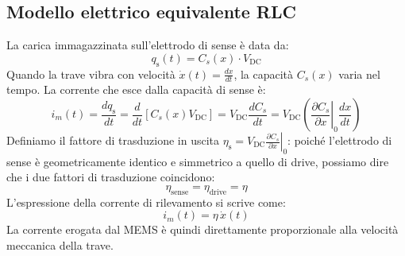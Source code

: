 \documentclass[11pt,a4paper]{article}
\begin{document}
\newpage

\subsection{Modello elettrico equivalente RLC}
\label{sec:modello_rlc}

La carica immagazzinata sull'elettrodo di sense è data da:
\begin{equation}
    q_{\text{s}}(t) = C_s(x) \cdot V_{\text{DC}}
\end{equation}
Quando la trave vibra con velocità $\dot{x}(t) = \frac{dx}{dt}$, la capacità $C_s(x)$ varia nel tempo. La corrente che esce dalla capacità di sense è:
\begin{equation}
    i_m(t) = \frac{d q_{\text{s}}}{dt} = \frac{d}{dt} \left[ C_s(x) V_{\text{DC}} \right] = V_{\text{DC}} \frac{d C_s}{dt} = V_{\text{DC}} \left( \left. \frac{\partial C_s}{\partial x} \right|_0 \frac{dx}{dt} \right)
\end{equation}
Definiamo il fattore di trasduzione in uscita $\eta_{\text{s}} = V_{\text{DC}} \left. \frac{\partial C_s}{\partial x} \right|_0$: poiché l'elettrodo di sense è geometricamente identico e simmetrico a quello di drive, possiamo dire che i due fattori di trasduzione coincidono:
\begin{equation}
    \eta_{\text{sense}} = \eta_{\text{drive}} = \eta
\end{equation}
L'espressione della corrente di rilevamento si scrive come:
\begin{equation}
    \label{eq:is_vs_xdot}
    i_m(t) = \eta \, \dot{x}(t)
\end{equation}
La corrente erogata dal MEMS è quindi direttamente proporzionale alla velocità meccanica della trave.
\vspace{0.3cm}
\end{document}

